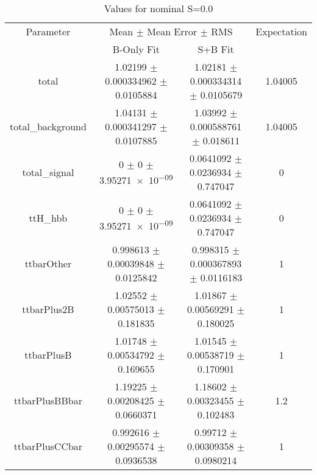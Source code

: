 \begin{table}
\centering
\caption{Values for nominal S=0.0}
\begin{tabular}{cccc}
\toprule
Parameter & \multicolumn{2}{c}{Mean $\pm$ Mean Error $\pm$ RMS} & Expectation\\
 & B-Only Fit & S+B Fit & \\
\midrule
total & \num{1.02199} $\pm$ \num{0.000334962} $\pm$ \num{0.0105884} & \num{1.02181} $\pm$ \num{0.000334314} $\pm$ \num{0.0105679} & \num{1.04005}\\
total\_background & \num{1.04131} $\pm$ \num{0.000341297} $\pm$ \num{0.0107885} & \num{1.03992} $\pm$ \num{0.000588761} $\pm$ \num{0.018611} & \num{1.04005}\\
total\_signal & \num{0} $\pm$ \num{0} $\pm$ \num{3.95271e-09} & \num{0.0641092} $\pm$ \num{0.0236934} $\pm$ \num{0.747047} & \num{0}\\
ttH\_hbb & \num{0} $\pm$ \num{0} $\pm$ \num{3.95271e-09} & \num{0.0641092} $\pm$ \num{0.0236934} $\pm$ \num{0.747047} & \num{0}\\
ttbarOther & \num{0.998613} $\pm$ \num{0.00039848} $\pm$ \num{0.0125842} & \num{0.998315} $\pm$ \num{0.000367893} $\pm$ \num{0.0116183} & \num{1}\\
ttbarPlus2B & \num{1.02552} $\pm$ \num{0.00575013} $\pm$ \num{0.181835} & \num{1.01867} $\pm$ \num{0.00569291} $\pm$ \num{0.180025} & \num{1}\\
ttbarPlusB & \num{1.01748} $\pm$ \num{0.00534792} $\pm$ \num{0.169655} & \num{1.01545} $\pm$ \num{0.00538719} $\pm$ \num{0.170901} & \num{1}\\
ttbarPlusBBbar & \num{1.19225} $\pm$ \num{0.00208425} $\pm$ \num{0.0660371} & \num{1.18602} $\pm$ \num{0.00323455} $\pm$ \num{0.102483} & \num{1.2}\\
ttbarPlusCCbar & \num{0.992616} $\pm$ \num{0.00295574} $\pm$ \num{0.0936538} & \num{0.99712} $\pm$ \num{0.00309358} $\pm$ \num{0.0980214} & \num{1}\\
\bottomrule
\end{tabular}
\end{table}